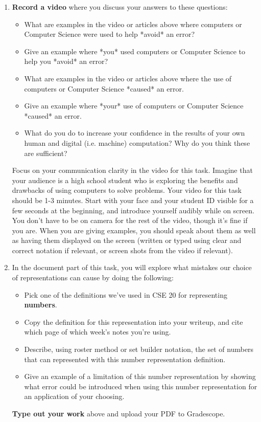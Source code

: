 \begin{enumerate}
    \item {\bf Record a video} where you discuss your answers to these questions:
    \begin{itemize}
        \item What are examples in the video or articles above where computers or Computer Science were used
        to help *avoid* an error?
        \item Give an example where *you* used computers or Computer Science 
        to help you *avoid* an error?
        \item What are examples in the video or articles above where the use of computers or Computer Science
         *caused* an error.
        \item Give an example where *your* use of computers or Computer Science 
        *caused* an error.
        \item What do you do to increase your confidence in the results of your own human and digital 
        (i.e. machine) computation? Why do you think these are sufficient?
     \end{itemize}
    Focus on your communication clarity in the video for this task. Imagine that your audience is a high school student
    who is exploring the benefits and drawbacks of using computers to solve problems.
    Your video for this task should be 1-3 minutes. Start with 
    your face and your student ID visible for a few seconds at the beginning, and introduce yourself audibly while on screen. 
    You don't have to be on camera for the rest of the video, though it's fine if you are. 
    When you are giving examples, you should speak about them as well as having them 
    displayed on the screen (written or typed using clear and correct notation if relevant, or screen shots from 
    the video if relevant).
    
    \item In the document part of this task, you will explore what mistakes our choice of representations can cause by doing the following:
    \begin{itemize}
        \item Pick one of the definitions we've used in CSE 20 for representing {\bf numbers}. 
        \item Copy the definition for this representation into your writeup, and cite 
        which page of which week's notes you're using.
        \item Describe, using roster method or set builder notation, the set of numbers that can represented 
        with this number representation definition.
        \item Give an example of a limitation of this number representation by showing 
        what error could be introduced when using this number representation for an application of your choosing.
    \end{itemize}
    {\bf Type out your work} above and upload your PDF to Gradescope.
    \end{enumerate}

